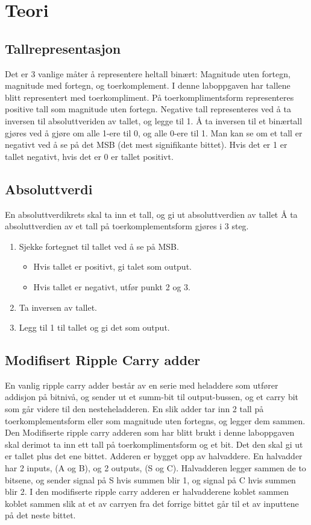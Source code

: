 \section{Teori}
  \subsection{Tallrepresentasjon}
    Det er 3 vanlige måter å representere heltall binært: Magnitude uten fortegn, magnitude med fortegn,
    og toerkomplement.
    I denne laboppgaven har tallene blitt representert med toerkompliment.
    På toerkomplimentsform representeres positive tall som magnitude uten fortegn.
    Negative tall representeres ved å ta inversen til absoluttveriden av tallet, og legge til 1.
    Å ta inversen til et binærtall gjøres ved å gjøre om alle 1-ere til 0, og alle 0-ere til 1.
    Man kan se om et tall er negativt ved å se på det MSB (det mest signifikante bittet). Hvis det er 1 er tallet negativt,
    hvis det er 0 er tallet positivt.
  \subsection{Absoluttverdi}
    En absoluttverdikrets skal ta inn et tall, og gi ut absoluttverdien av tallet
    Å ta absoluttverdien av et tall på toerkomplementsform gjøres i 3 steg.
    \begin{enumerate}
      \item Sjekke fortegnet til tallet ved å se på MSB.
      \begin{itemize}
        \item Hvis tallet er positivt, gi talet som output.
        \item Hvis tallet er negativt, utfør punkt 2 og 3.
      \end{itemize}
      \item Ta inversen av tallet.
      \item Legg til 1 til tallet og gi det som output.
    \end{enumerate}
  \subsection{Modifisert Ripple Carry adder}
    En vanlig ripple carry adder består av en serie med heladdere som utfører addisjon på bitnivå, og sender ut et summ-bit til output-bussen, og et carry bit som går videre til den nesteheladderen. En slik adder tar inn 2 tall på toerkomplementsform eller som magnitude uten fortegns, og legger dem sammen. Den Modifiserte ripple carry adderen som har blitt brukt i denne laboppgaven skal derimot ta inn
    ett tall på toerkomplimentsform og et bit. Det den skal gi ut er tallet plus det ene bittet.
    Adderen er bygget opp av halvaddere. En halvadder har 2 inputs, (A og B), og 2 outputs, (S og C).
    Halvadderen legger sammen de to bitsene, og sender signal på S hvis summen blir 1, og signal på C hvis summen blir 2.
    I den modifiserte ripple carry adderen er halvadderene koblet sammen koblet sammen slik at et av carryen fra det forrige bittet går til et av inputtene på det neste bittet.
